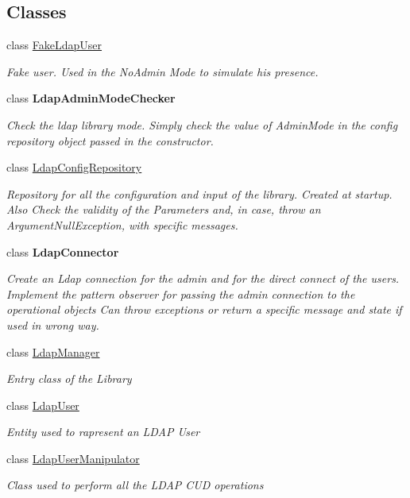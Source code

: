 \subsection*{Classes}
\begin{DoxyCompactItemize}
\item 
class \hyperlink{class_l_d_a_p_library_1_1_fake_ldap_user}{Fake\+Ldap\+User}
\begin{DoxyCompactList}\small\item\em Fake user. Used in the No\+Admin Mode to simulate his presence. \end{DoxyCompactList}\item 
class {\bfseries Ldap\+Admin\+Mode\+Checker}
\begin{DoxyCompactList}\small\item\em Check the ldap library mode. Simply check the value of Admin\+Mode in the config repository object passed in the constructor. \end{DoxyCompactList}\item 
class \hyperlink{class_l_d_a_p_library_1_1_ldap_config_repository}{Ldap\+Config\+Repository}
\begin{DoxyCompactList}\small\item\em Repository for all the configuration and input of the library. Created at startup. Also Check the validity of the Parameters and, in case, throw an Argument\+Null\+Exception, with specific messages. \end{DoxyCompactList}\item 
class {\bfseries Ldap\+Connector}
\begin{DoxyCompactList}\small\item\em Create an Ldap connection for the admin and for the direct connect of the users. Implement the pattern observer for passing the admin connection to the operational objects Can throw exceptions or return a specific message and state if used in wrong way. \end{DoxyCompactList}\item 
class \hyperlink{class_l_d_a_p_library_1_1_ldap_manager}{Ldap\+Manager}
\begin{DoxyCompactList}\small\item\em Entry class of the Library \end{DoxyCompactList}\item 
class \hyperlink{class_l_d_a_p_library_1_1_ldap_user}{Ldap\+User}
\begin{DoxyCompactList}\small\item\em Entity used to rapresent an L\+D\+A\+P User \end{DoxyCompactList}\item 
class \hyperlink{class_l_d_a_p_library_1_1_ldap_user_manipulator}{Ldap\+User\+Manipulator}
\begin{DoxyCompactList}\small\item\em Class used to perform all the L\+D\+A\+P C\+U\+D operations \end{DoxyCompactList}\end{DoxyCompactItemize}
